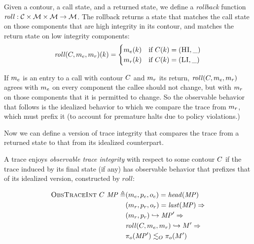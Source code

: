 \documentclass[acmsmall,review,anonymous]{acmart}\settopmatter{printfolios=true,printccs=false,printacmref=false}
\begin{document}

      Given a contour, a call state, and a returned state, we define a
      {\em rollback} function \(\mathit{roll} : {\mathcal C} \times {\mathcal M} \times
      {\mathcal M} \rightarrow {\mathcal M}\). The rollback returns a state that matches
      the call state on those components that are high integrity in its
      contour, and matches the return state on low integrity components:
      \[\mathit{roll}(C,m_e,m_r)(k) =
      \begin{cases}
        m_e(k) & \text{if } C(k) = (\textsc{HI},\_) \\
        m_r(k) & \text{if } C(k) = (\textsc{LI},\_) \\
      \end{cases}\]

      If \(m_e\) is an entry to a call with contour \(C\) and
      \(m_r\) its return, \(\mathit{roll}(C,m_e,m_r)\)
      agrees with \(m_e\) on every component the callee should not change,
      but with \(m_r\) on those components that it is permitted to change.
      So the observable behavior that follows is the idealized behavior to
      which we compare the trace from \(m_r\), which must prefix it (to
      account for premature halts due to policy violations.)

      Now we can define a version of trace integrity that compares the trace
      from a returned state to that from its idealized counterpart.


      A trace enjoys {\em observable trace integrity} with respect to
      some contour \(C\) if the trace induced by its final state
      (if any) has observable behavior that prefixes that of its idealized
      version, constructed by \(\mathit{roll}\):

      \[\begin{split}
        \text{\sc ObsTraceInt} ~ C ~ \mathit{MP} \triangleq
        & (m_e,p_e,o_e) = \mathit{head}(\mathit{MP}) \\
        & (m_r,p_r,o_r) = \mathit{last}(\mathit{MP}) \Rightarrow \\
        & (m_r,p_r) \hookrightarrow \mathit{MP}' \Rightarrow \\
        & \mathit{roll}(C,m_e,m_r) \hookrightarrow M'
          \Rightarrow \\
        & \pi_o(\mathit{MP}') \lesssim_O \pi_o(M')
      \end{split}\]
\end{document}
